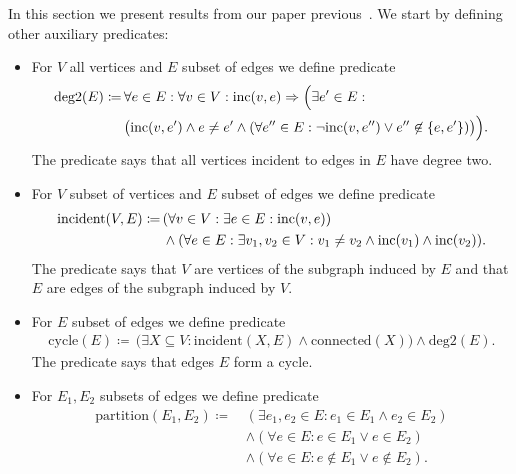 In this section we present results from our paper previous~\cite{my_paper}.
We start by defining other auxiliary predicates:
%
\begin{itemize}
	\item For \( V \) all vertices and \( E \) subset of edges we define predicate
	      \begin{align*}
		      \text{deg2}(E) \coloneqq \,
		       & \forall e \in E : \forall v \in V : \text{inc} (v, e) \Rightarrow \Big( \exists e' \in E : \\
		       & \big( \text{inc} (v, e') \land e \ne e' \land (\forall e^{\prime\prime} \in E :
				      \lnot \text{inc} (v, e^{\prime\prime}) \lor e^{\prime\prime} \not\in \{e, e'\}) \big) \Big).
	      \end{align*}
	      The predicate says that all vertices incident to edges in \( E \) have degree two.
	\item For \( V \) subset of vertices and \( E \) subset of edges we define predicate
	      \begin{align*}
		      \text{incident}(V, E) \coloneqq \,
		       & (\forall v \in V : \exists e \in E : \text{inc} (v, e))                                                 \\
		       & \land (\forall e \in E : \exists v_1, v_2 \in V : v_1 \ne v_2 \land \text{inc} (v_1) \land \text{inc} (v_2)).
	      \end{align*}
	      The predicate says that \( V \) are vertices of the subgraph induced by \( E \)
	      and that \( E \) are edges of the subgraph induced by \( V \).
	\item For \( E \) subset of edges we define predicate
	      \begin{align*}
		      \text{cycle}(E) \coloneqq \,
		      \big( \exists X \subseteq V : \text{incident}(X, E) \land \text{connected}(X) \big)
		      \land \text{deg2}(E).
	      \end{align*}
	      The predicate says that edges \( E \) form a cycle.
	\item For \( E_1, E_2 \) subsets of edges we define predicate
	      \begin{align*}
		      \text{partition}(E_1, E_2) \coloneqq \, & (\exists e_1, e_2 \in E : e_1 \in E_1 \land e_2 \in E_2 )    \\
		                                              & \land (\forall e \in E : e \in E_1 \lor e \in E_2 )          \\
		                                              & \land (\forall e \in E : e \not\in E_1 \lor e \not\in E_2 ).

\end{align*}
\end{itemize}
